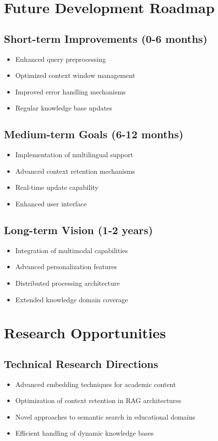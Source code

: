 \documentclass[12pt,a4paper]{report}
\begin{document}
\section{Future Development Roadmap}

\subsection{Short-term Improvements (0-6 months)}
\begin{itemize}
    \item Enhanced query preprocessing
    \item Optimized context window management
    \item Improved error handling mechanisms
    \item Regular knowledge base updates
\end{itemize}

\subsection{Medium-term Goals (6-12 months)}
\begin{itemize}
    \item Implementation of multilingual support
    \item Advanced context retention mechanisms
    \item Real-time update capability
    \item Enhanced user interface
\end{itemize}

\subsection{Long-term Vision (1-2 years)}
\begin{itemize}
    \item Integration of multimodal capabilities
    \item Advanced personalization features
    \item Distributed processing architecture
    \item Extended knowledge domain coverage
\end{itemize}

\section{Research Opportunities}

\subsection{Technical Research Directions}
\begin{itemize}
    \item Advanced embedding techniques for academic content
    \item Optimization of context retention in RAG architectures
    \item Novel approaches to semantic search in educational domains
    \item Efficient handling of dynamic knowledge bases
\end{itemize}
\end{document}

